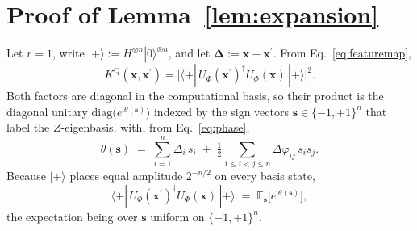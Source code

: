 %
%

\appendices
\section{Proof of Lemma~\ref{lem:expansion}}
\label{app:lemma}

Let $r=1$, write $|+\rangle := H^{\otimes n}|0\rangle^{\otimes n}$, and let
$\bm{\Delta} := \bm{x}-\bm{x}^{\prime}$. From Eq.~\eqref{eq:featuremap},
\begin{equation*}
  K^{\mathrm{Q}}(\bm{x},\bm{x}^{\prime})
  = \bigl|\langle +|\,U_{\Phi}(\bm{x}^{\prime})^{\dagger}U_{\Phi}(\bm{x})\,
    |+\rangle\bigr|^{2}.
\end{equation*}
Both factors are diagonal in the computational basis, so their product is the
diagonal unitary $\mathrm{diag}\bigl(e^{\mathrm{i}\theta(\bm{s})}\bigr)$ indexed
by the sign vectors $\bm{s}\in\{-1,+1\}^{n}$ that label the $Z$-eigenbasis, with,
from Eq.~\eqref{eq:phase},
\begin{equation}
\label{eq:theta}
  \theta(\bm{s}) \;=\; \sum_{i=1}^{n}\Delta_i\,s_i
  \;+\; \tfrac{1}{2}\!\!\sum_{1\le i<j\le n}\!\!\Delta\varphi_{ij}\,s_is_j .
\end{equation}
Because $|+\rangle$ places equal amplitude $2^{-n/2}$ on every basis state,
\begin{equation}
\label{eq:expectation}
  \langle +|\,U_{\Phi}(\bm{x}^{\prime})^{\dagger}U_{\Phi}(\bm{x})\,|+\rangle
  \;=\; \mathbb{E}_{\bm{s}}\bigl[e^{\mathrm{i}\theta(\bm{s})}\bigr],
\end{equation}
the expectation being over $\bm{s}$ uniform on $\{-1,+1\}^{n}$.

